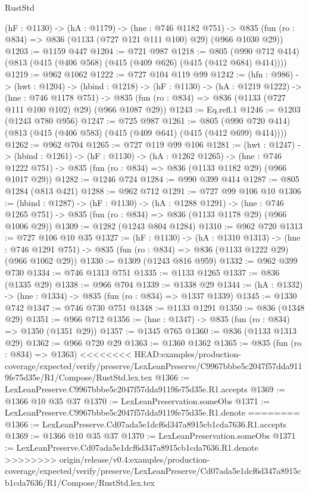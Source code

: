 \begin{lexlean}{RustStd}
\begin{coremodule}
{\begin{coremodule}
  (hF : @1130) ->
  (hA : @1179) ->
  (hne : @746 @1182 @751) ->
  @835 (fun (ro : @834) => @836 (@1133 (@727 @121 @111 @100) @29) (@966 @1030 @29))
@1203 := @1159 @447
@1204 := @721 @987
@1218 := @805 (@990 @712 @414) (@813 (@415 (@406 @568) (@415 (@409 @626) (@415 (@412 @684) @414))))
@1219 := @962 @1062
@1222 := @727 @104 @119 @99
@1242 := (hfn : @986) ->
  (hwt : @1204) ->
  (hbind : @1218) ->
  (hF : @1130) ->
  (hA : @1219 @1222) ->
  (hne : @746 @1178 @751) ->
  @835 (fun (ro : @834) => @836 (@1133 (@727 @111 @100 @102) @29) (@966 @1087 @29))
@1243 := Eq.refl.{1}
@1246 := @1203 (@1243 @780 @956)
@1247 := @725 @987
@1261 := @805 (@990 @720 @414) (@813 (@415 (@406 @583) (@415 (@409 @641) (@415 (@412 @699) @414))))
@1262 := @962 @704
@1265 := @727 @119 @99 @106
@1281 := (hwt : @1247) ->
  (hbind : @1261) ->
  (hF : @1130) ->
  (hA : @1262 @1265) ->
  (hne : @746 @1222 @751) -> @835 (fun (ro : @834) => @836 (@1133 @1182 @29) (@966 @1017 @29))
@1282 := @1246 @724
@1284 := @990 @399 @414
@1287 := @805 @1284 (@813 @421)
@1288 := @962 @712
@1291 := @727 @99 @106 @10
@1306 := (hbind : @1287) ->
  (hF : @1130) ->
  (hA : @1288 @1291) ->
  (hne : @746 @1265 @751) -> @835 (fun (ro : @834) => @836 (@1133 @1178 @29) (@966 @1006 @29))
@1309 := @1282 (@1243 @804 @1284)
@1310 := @962 @720
@1313 := @727 @106 @10 @35
@1327 := (hF : @1130) ->
  (hA : @1310 @1313) ->
  (hne : @746 @1291 @751) -> @835 (fun (ro : @834) => @836 (@1133 @1222 @29) (@966 @1062 @29))
@1330 := @1309 (@1243 @816 @959)
@1332 := @962 @399 @730
@1334 := @746 @1313 @751
@1335 := @1133 @1265
@1337 := @836 (@1335 @29)
@1338 := @966 @704
@1339 := @1338 @29
@1344 := (hA : @1332) -> (hne : @1334) -> @835 (fun (ro : @834) => @1337 @1339)
@1345 := @1330 @742
@1347 := @746 @730 @751
@1348 := @1133 @1291
@1350 := @836 (@1348 @29)
@1351 := @966 @712
@1356 := (hne : @1347) -> @835 (fun (ro : @834) => @1350 (@1351 @29))
@1357 := @1345 @765
@1360 := @836 (@1133 @1313 @29)
@1362 := @966 @720 @29
@1363 := @1360 @1362
@1365 := @835 (fun (ro : @834) => @1363)
<<<<<<<< HEAD:examples/production-coverage/expected/verify/preserve/LexLeanPreserve/C9967bbbe5c2047f57dda9119fe75d35e/R1/Compose/RustStd.lex.tex
@1366 := LexLeanPreserve.C9967bbbe5c2047f57dda9119fe75d35e.R1.accepts
@1369 := @1366 @10 @35 @37
@1370 := LexLeanPreservation.someObs
@1371 := LexLeanPreserve.C9967bbbe5c2047f57dda9119fe75d35e.R1.denote
========
@1366 := LexLeanPreserve.Cd07ada5e1dcf6d347a8915cb1cda7636.R1.accepts
@1369 := @1366 @10 @35 @37
@1370 := LexLeanPreservation.someObs
@1371 := LexLeanPreserve.Cd07ada5e1dcf6d347a8915cb1cda7636.R1.denote
>>>>>>>> origin/release/v0.4:examples/production-coverage/expected/verify/preserve/LexLeanPreserve/Cd07ada5e1dcf6d347a8915cb1cda7636/R1/Compose/RustStd.lex.tex

\end{coremodule}}
\end{coremodule}
\end{lexlean}
